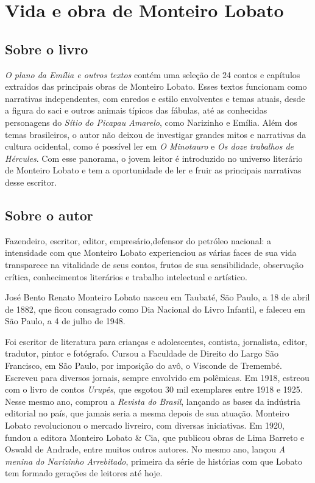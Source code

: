 \chapter{Vida e obra de Monteiro Lobato}

\section{Sobre o livro}
\textit{O plano da Emília e outros textos} contém uma seleção de 24 contos e capítulos extraídos das principais obras de Monteiro Lobato. Esses textos funcionam como narrativas independentes, com enredos e estilo  envolventes e temas atuais, desde a figura do saci e outros animais típicos das fábulas, até as conhecidas personagens do \textit{Sítio do Picapau Amarelo}, como Narizinho e Emília. Além dos temas brasileiros, o autor não deixou de investigar grandes mitos e narrativas da cultura ocidental, como é possível ler em \textit{O Minotauro} e \textit{Os doze trabalhos de Hércules}. Com esse panorama, o jovem leitor é introduzido no universo literário de Monteiro Lobato e tem a oportunidade de ler e fruir as principais narrativas desse escritor.

\section{Sobre o autor}

Fazendeiro, escritor, editor, empresário,defensor do petróleo nacional: 
a intensidade com que Monteiro Lobato experienciou as várias faces 
de sua vida transparece na vitalidade de
seus contos, frutos de sua sensibilidade, observação crítica,
conhecimentos literários e trabalho intelectual e artístico.

José Bento Renato Monteiro Lobato nasceu em Taubaté, São Paulo, a 18 de
abril de 1882, que ficou consagrado como Dia Nacional do Livro Infantil,
e faleceu em São Paulo, a 4 de julho de 1948.

Foi escritor de literatura para crianças e adolescentes, contista, jornalista, editor,
tradutor, pintor e fotógrafo. Cursou a Faculdade de Direito do Largo São Francisco, em São Paulo, por imposição
do avô, o Visconde de Tremembé. Escreveu para diversos jornais, sempre envolvido em polêmicas.  
Em 1918, estreou com o livro de contos \textit{Urupês}, que esgotou 30 mil
exemplares entre 1918 e 1925. Nesse mesmo ano, comprou a \textit{Revista do Brasil},
lançando as bases da indústria editorial no país, que jamais seria a mesma depois de sua atuação. 
Monteiro Lobato revolucionou o mercado livreiro, com diversas iniciativas. Em 1920, fundou a
editora Monteiro Lobato \& Cia, que publicou obras de Lima Barreto e Oswald de Andrade, entre muitos outros autores. No mesmo ano, lançou \textit{A menina do Narizinho Arrebitado}, primeira da série
de histórias com que Lobato tem formado gerações de leitores até hoje. 

